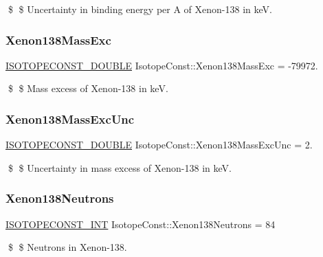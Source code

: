 \$ \$ Uncertainty in binding energy per A of Xenon-\/138 in keV. \mbox{\label{group___isotope_const-_xenon-_xe138_ga398ebad9f25bbeaff7e061c04f24820b}} 
\subsubsection{\texorpdfstring{Xenon138\+Mass\+Exc}{Xenon138MassExc}}
{\footnotesize\ttfamily \mbox{\hyperlink{group___isotope_const-_macros_ga8f45a7272ce02c0b4c65c44636ed719a}{I\+S\+O\+T\+O\+P\+E\+C\+O\+N\+S\+T\+\_\+\+D\+O\+U\+B\+LE}} Isotope\+Const\+::\+Xenon138\+Mass\+Exc = -\/79972.}

\$ \$ Mass excess of Xenon-\/138 in keV. \mbox{\label{group___isotope_const-_xenon-_xe138_gacf1740a4d56273d8506b43c90dd4757d}} 
\subsubsection{\texorpdfstring{Xenon138\+Mass\+Exc\+Unc}{Xenon138MassExcUnc}}
{\footnotesize\ttfamily \mbox{\hyperlink{group___isotope_const-_macros_ga8f45a7272ce02c0b4c65c44636ed719a}{I\+S\+O\+T\+O\+P\+E\+C\+O\+N\+S\+T\+\_\+\+D\+O\+U\+B\+LE}} Isotope\+Const\+::\+Xenon138\+Mass\+Exc\+Unc = 2.}

\$ \$ Uncertainty in mass excess of Xenon-\/138 in keV. \mbox{\label{group___isotope_const-_xenon-_xe138_gae66b435c48d1a463b5fdab107016fa10}} 
\subsubsection{\texorpdfstring{Xenon138\+Neutrons}{Xenon138Neutrons}}
{\footnotesize\ttfamily \mbox{\hyperlink{group___isotope_const-_macros_ga5f18360b3e99483a35c32d789e62621c}{I\+S\+O\+T\+O\+P\+E\+C\+O\+N\+S\+T\+\_\+\+I\+NT}} Isotope\+Const\+::\+Xenon138\+Neutrons = 84}

\$ \$ Neutrons in Xenon-\/138. \mbox{\label{group___isotope_const-_xenon-_xe138_ga6c6fa5a310466099f0466fcdbf9faf59}} 
